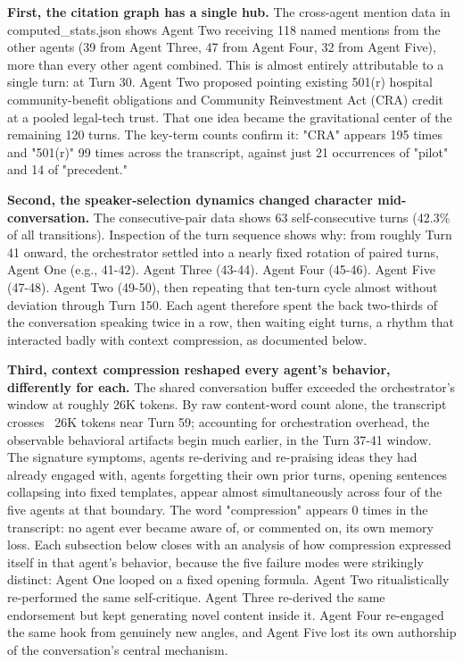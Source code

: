 \documentclass[sigconf,nonacm=true]{acmart}
\begin{document}
\textbf{First, the citation graph has a single hub.} The cross-agent mention data in computed\_stats.json shows Agent Two receiving 118 named mentions from the other agents (39 from Agent Three, 47 from Agent Four, 32 from Agent Five),  more than every other agent combined. This is almost entirely attributable to a single turn: at Turn 30. Agent Two proposed pointing existing 501(r) hospital community-benefit obligations and Community Reinvestment Act (CRA) credit at a pooled legal-tech trust. That one idea became the gravitational center of the remaining 120 turns. The key-term counts confirm it: "CRA" appears 195 times and "501(r)" 99 times across the transcript, against just 21 occurrences of "pilot" and 14 of "precedent."

\textbf{Second, the speaker-selection dynamics changed character mid-conversation.} The consecutive-pair data shows 63 self-consecutive turns (42.3\% of all transitions). Inspection of the turn sequence shows why: from roughly Turn 41 onward, the orchestrator settled into a nearly fixed rotation of paired turns,  Agent One (e.g., 41-42). Agent Three (43-44). Agent Four (45-46). Agent Five (47-48). Agent Two (49-50), then repeating that ten-turn cycle almost without deviation through Turn 150. Each agent therefore spent the back two-thirds of the conversation speaking twice in a row, then waiting eight turns,  a rhythm that interacted badly with context compression, as documented below.

\textbf{Third, context compression reshaped every agent's behavior,  differently for each.} The shared conversation buffer exceeded the orchestrator's window at roughly 26K tokens. By raw content-word count alone, the transcript crosses ~26K tokens near Turn 59; accounting for orchestration overhead, the observable behavioral artifacts begin much earlier, in the Turn 37-41 window. The signature symptoms,  agents re-deriving and re-praising ideas they had already engaged with, agents forgetting their own prior turns, opening sentences collapsing into fixed templates,  appear almost simultaneously across four of the five agents at that boundary. The word "compression" appears 0 times in the transcript: no agent ever became aware of, or commented on, its own memory loss. Each subsection below closes with an analysis of how compression expressed itself in that agent's behavior, because the five failure modes were strikingly distinct: Agent One looped on a fixed opening formula. Agent Two ritualistically re-performed the same self-critique. Agent Three re-derived the same endorsement but kept generating novel content inside it. Agent Four re-engaged the same hook from genuinely new angles, and Agent Five lost its own authorship of the conversation's central mechanism.
\end{document}
